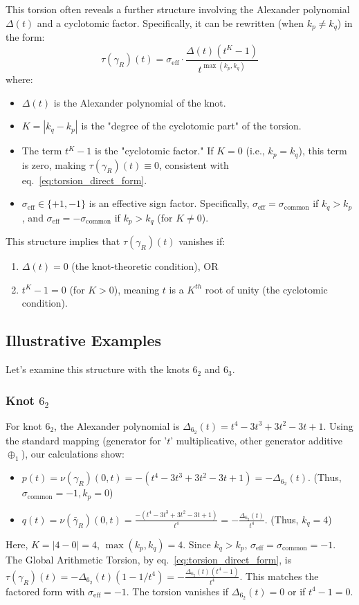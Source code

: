 \documentclass{article}[a4paper,12pt]
\begin{document}
This torsion often reveals a further structure involving the Alexander polynomial $\Delta(t)$ and a cyclotomic factor. Specifically, it can be rewritten (when $k_p \neq k_q$) in the form:
\begin{equation} \label{eq:torsion_factored_form}
\tau(\gamma_R)(t) = \sigma_{\text{eff}} \cdot \frac{\Delta(t)(t^K-1)}{t^{\max(k_p, k_q)}}
\end{equation}
where:
\begin{itemize}
    \item $\Delta(t)$ is the Alexander polynomial of the knot.
    \item $K = |k_q - k_p|$ is the "degree of the cyclotomic part" of the torsion.
    \item The term $t^K-1$ is the "cyclotomic factor." If $K=0$ (i.e., $k_p=k_q$), this term is zero, making $\tau(\gamma_R)(t) \equiv 0$, consistent with eq.~\eqref{eq:torsion_direct_form}.
    \item $\sigma_{\text{eff}} \in \{+1, -1\}$ is an effective sign factor. Specifically, $\sigma_{\text{eff}} = \sigma_{\text{common}}$ if $k_q > k_p$, and $\sigma_{\text{eff}} = -\sigma_{\text{common}}$ if $k_p > k_q$ (for $K \neq 0$).
\end{itemize}
This structure implies that $\tau(\gamma_R)(t)$ vanishes if:
\begin{enumerate}
    \item $\Delta(t)=0$ (the knot-theoretic condition), OR
    \item $t^K-1=0$ (for $K>0$), meaning $t$ is a $K^{th}$ root of unity (the cyclotomic condition).
\end{enumerate}

\subsection{Illustrative Examples}

Let's examine this structure with the knots $6_2$ and $6_3$.

\subsubsection{Knot $6_2$}
For knot $6_2$, the Alexander polynomial is $\Delta_{6_2}(t) = t^4 - 3t^3 + 3t^2 - 3t + 1$.
Using the standard mapping (generator for '$t$' multiplicative, other generator additive $\oplus_1$), our calculations show:
\begin{itemize}
    \item $p(t) = \nu(\gamma_R)(0,t) = -(t^4 - 3t^3 + 3t^2 - 3t + 1) = -\Delta_{6_2}(t)$.
    (Thus, $\sigma_{\text{common}}=-1, k_p=0$)
    \item $q(t) = \nu(\bar{\gamma}_R)(0,t) = \frac{-(t^4 - 3t^3 + 3t^2 - 3t + 1)}{t^4} = -\frac{\Delta_{6_2}(t)}{t^4}$.
    (Thus, $k_q=4$)
\end{itemize}
Here, $K = |4-0| = 4$, $\max(k_p,k_q)=4$. Since $k_q > k_p$, $\sigma_{\text{eff}} = \sigma_{\text{common}} = -1$.
The Global Arithmetic Torsion, by eq.~\eqref{eq:torsion_direct_form}, is $\tau(\gamma_R)(t) = -\Delta_{6_2}(t)(1 - 1/t^4) = -\frac{\Delta_{6_2}(t)(t^4-1)}{t^4}$.
This matches the factored form with $\sigma_{\text{eff}}=-1$. The torsion vanishes if $\Delta_{6_2}(t)=0$ or if $t^4-1=0$.
\end{document}
